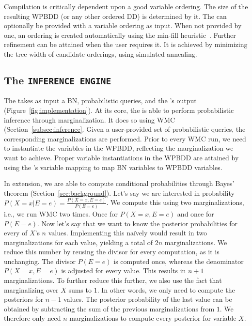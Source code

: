 Compilation is critically dependent upon a good variable ordering. The size of the resulting WPBDD (or any other ordered DD) is determined by it. The \compiler can optionally be provided with a variable ordering as input. When not provided by one, an ordering is created automatically using the min-fill heuristic~\cite{chavira2008probabilistic}. Further refinement can be attained when the user requires it. It is achieved by minimizing the tree-width of candidate orderings, using simulated annealing.

\subsection{The \texttt{INFERENCE ENGINE}}

The \engine takes as input a BN, probabilistic queries, and the \compiler's output (Figure~\ref{fig:implementation}). At its core, the \engine is able to perform probabilistic inference through marginalization. It does so using WMC (Section~\ref{subsec:inference}. Given a user-provided set of probabilistic queries, the corresponding marginalizations are performed. Prior to every WMC run, we need to instantiate the variables in the WPBDD, reflecting the marginalization we want to achieve. Proper variable instantiations in the WPBDD are attained by using the \compiler's variable mapping to map BN variables to WPBDD variables.

In extension, we are able to compute conditional probabilities through Bayes' theorem (Section~\ref{sec:background}). Let's say we are interested in probability $P(X = x | E = e) = \frac{P(X = x, E = e)}{P(E = e)}$.
We compute this using two marginalizations, i.e., we run WMC two times. Once for $P(X = x, E = e)$ and once for $P(E = e)$. Now let's say that we want to know the posterior probabilities for every of $X$'s $n$ values. Implementing this na\"ively would result in two marginalizations for each value, yielding a total of $2n$ marginalizations. We reduce this number by reusing the divisor for every computation, as it is unchanging. The divisor $P(E = e)$ is computed once, whereas the denominator $P(X = x, E = e)$ is adjusted for every value. This results in $n + 1$ marginalizations. To further reduce this further, we also use the fact that marginalizing over $X$ sums to $1$. In other words, we only need to compute the posteriors for $n-1$ values. The posterior probability of the last value can be obtained by subtracting the sum of the previous marginalizations from $1$. We therefore only need $n$ marginalizations to compute every posterior for variable $X$.

